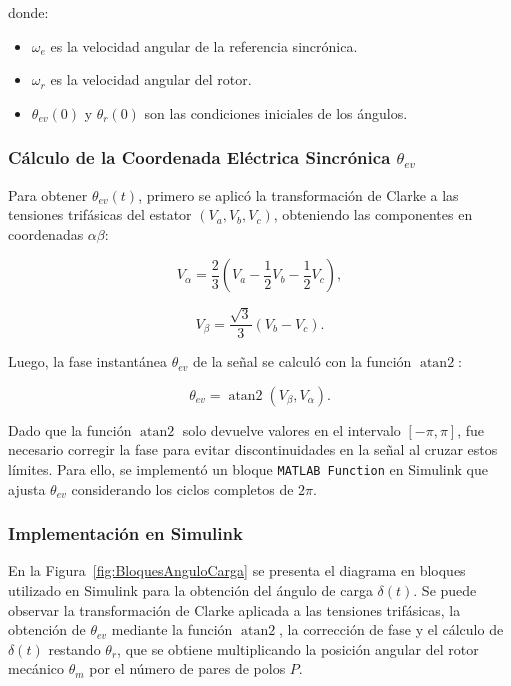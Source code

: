 \documentclass{article}
\begin{document}
donde:
\begin{itemize}
    \item \(\omega_e\) es la velocidad angular de la referencia sincrónica.
    \item \(\omega_r\) es la velocidad angular del rotor.
    \item \(\theta_{ev}(0)\) y \(\theta_r(0)\) son las condiciones iniciales de los ángulos.
\end{itemize}

\subsubsection*{Cálculo de la Coordenada Eléctrica Sincrónica \(\theta_{ev}\)}

Para obtener \(\theta_{ev}(t)\), primero se aplicó la transformación de Clarke a las tensiones trifásicas del estator \((V_a, V_b, V_c)\), obteniendo las componentes en coordenadas \(\alpha \beta\):

\begin{equation}
    V_{\alpha} = \frac{2}{3} \left( V_a - \frac{1}{2} V_b - \frac{1}{2} V_c \right),
\end{equation}

\begin{equation}
    V_{\beta} = \frac{\sqrt{3}}{3} (V_b - V_c).
\end{equation}

Luego, la fase instantánea \(\theta_{ev}\) de la señal se calculó con la función \(\operatorname{atan2}\):

\begin{equation}
    \theta_{ev} = \operatorname{atan2}(V_{\beta}, V_{\alpha}).
\end{equation}

Dado que la función \(\operatorname{atan2}\) solo devuelve valores en el intervalo \([- \pi, \pi]\), fue necesario corregir la fase para evitar discontinuidades en la señal al cruzar estos límites. Para ello, se implementó un bloque \texttt{MATLAB Function} en Simulink que ajusta \(\theta_{ev}\) considerando los ciclos completos de \(2\pi\).

\subsubsection*{Implementación en Simulink}

En la Figura~\ref{fig:BloquesAnguloCarga} se presenta el diagrama en bloques utilizado en Simulink para la obtención del ángulo de carga \(\delta(t)\). Se puede observar la transformación de Clarke aplicada a las tensiones trifásicas, la obtención de \(\theta_{ev}\) mediante la función \(\operatorname{atan2}\), la corrección de fase y el cálculo de \(\delta(t)\) restando \(\theta_r\), que se obtiene multiplicando la posición angular del rotor mecánico \(\theta_m\) por el número de pares de polos \(P\).
\end{document}
